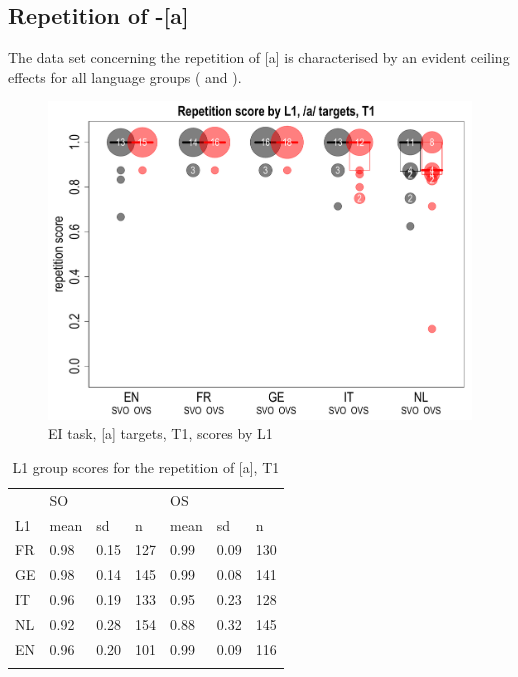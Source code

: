 \subsection{Repetition of -[a]}\label{sec:04:2.5}

The data set concerning the repetition of [a] is characterised by an evident ceiling effects for all language groups ( and ).

\begin{figure}
    \includegraphics[width=\textwidth]{figures/04-6.pdf}
    \caption{EI task, [a] targets, T1, scores by L1}
    \label{fig:04:6}
\end{figure}

\begin{table}
    \begin{tabularx}{\textwidth}{XXXXXXX} & \multicolumn{3}{X}{SO} & \multicolumn{3}{X}{OS}\\
    \lsptoprule
    L1 & mean & sd & n & mean & sd & n\\
    \midrule
    FR & 0.98 & 0.15 & 127 & 0.99 & 0.09 & 130\\
    GE & 0.98 & 0.14 & 145 & 0.99 & 0.08 & 141\\
    IT & 0.96 & 0.19 & 133 & 0.95 & 0.23 & 128\\
    NL & 0.92 & 0.28 & 154 & 0.88 & 0.32 & 145\\
    EN & 0.96 & 0.20 & 101 & 0.99 & 0.09 & 116\\
    \lspbottomrule
    \end{tabularx}
    \caption{L1 group scores for the repetition of [a], T1}
    \label{tab:04:7}
\end{table}


